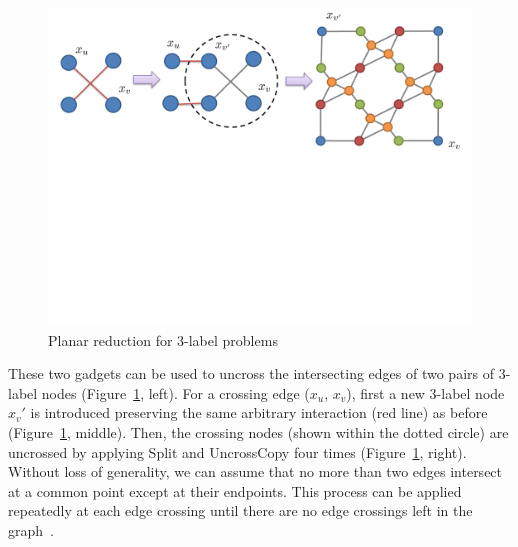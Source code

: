 \begin{figure}[b]
\begin{center}
   \includegraphics[trim={0 10.5cm 0 0}, clip, width=0.7\linewidth]{figure/Planar/Planar-3.pdf}
\end{center}
\caption{Planar reduction for 3-label problems} \label{fig:planarreduct}
\end{figure}

These two gadgets can be used to uncross the intersecting edges of two pairs of 3-label nodes (Figure~\ref{fig:planarreduct}, left).  For a crossing edge ($x_u$, $x_v$), first a new 3-label node $x_v'$ is introduced preserving the same arbitrary interaction (red line) as before (Figure~\ref{fig:planarreduct}, middle). Then, the crossing nodes (shown within the dotted circle) are uncrossed by applying {\sc Split} and {\sc UncrossCopy} four times (Figure~\ref{fig:planarreduct}, right).
Without loss of generality, we can assume that no more than two edges intersect at a common point except at their endpoints.  This process can be applied repeatedly at each edge crossing until there are no edge crossings left in the graph~\cite{prusa2015universality}.
